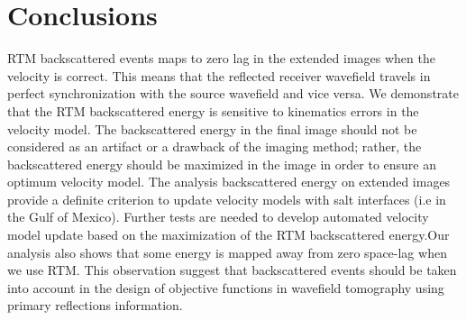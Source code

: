 \section{Conclusions}

RTM backscattered events maps to zero lag in the extended images when the
velocity is correct. This means that the reflected
receiver wavefield travels in perfect synchronization with the source wavefield and
vice versa. We demonstrate that the RTM backscattered energy is sensitive to kinematics errors
in the velocity model. The backscattered energy in the final image should not be considered 
as an artifact or a drawback of the imaging method; rather, the backscattered energy
 should be maximized in the image in order to ensure an optimum velocity 
model. The analysis backscattered energy on extended images provide a definite criterion to update 
velocity models with salt interfaces (i.e in the Gulf of Mexico).
 Further tests are needed to develop automated velocity model update based on the maximization of 
the RTM backscattered energy.Our analysis also shows that some energy is mapped away from zero space-lag when
we use RTM. This observation suggest that backscattered events should be taken into account in the design 
of objective functions in wavefield tomography using primary reflections information.
